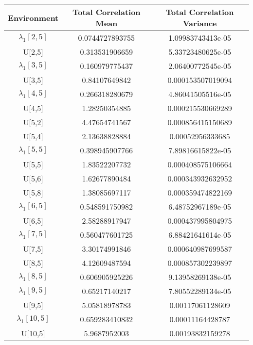 \begin{table}[ht!]
\begin{tabular}{|c|c|c|}
\hline
Environment & Total Correlation Mean& Total Correlation Variance\\
\hline
\hline
$\lambda_{1}[2,5]$ &0.0744727893755&1.09983743413e-05\\
U[2,5] &0.313531906659&5.33723480625e-05\\
$\lambda_{1}[3,5]$ &0.160979775437&2.06400772545e-05\\
U[3,5] &0.84107649842&0.000153507019094\\
$\lambda_{1}[4,5]$ &0.266318280679&4.86041505516e-05\\
U[4,5] &1.28250354885&0.000215530669289\\
U[5,2] &4.47654741567&0.000856415150689\\
U[5,4] &2.13638828884&0.00052956333685\\
$\lambda_{1}[5,5]$ &0.398945907766&7.89816615822e-05\\
U[5,5] &1.83522207732&0.000408575106664\\
U[5,6] &1.62677890484&0.000343932632952\\
U[5,8] &1.38085697117&0.000359474822169\\
$\lambda_{1}[6,5]$ &0.548591750982&6.48752967189e-05\\
U[6,5] &2.58288917947&0.000437995804975\\
$\lambda_{1}[7,5]$ &0.560477601725&6.88421641614e-05\\
U[7,5] &3.30174991846&0.000640987699587\\
U[8,5] &4.12609487594&0.000857302239897\\
$\lambda_{1}[8,5]$ &0.606905925226&9.13958269138e-05\\
$\lambda_{1}[9,5]$ &0.65217140217&7.80552289134e-05\\
U[9,5] &5.05818978783&0.00117061128609\\
$\lambda_{1}[10,5]$ &0.659283410832&0.00011164428787\\
U[10,5] &5.9687952003&0.00193832159278\\
\hline
\end{tabular}
\end{table}
